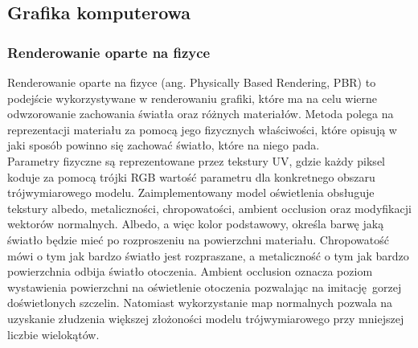 
\subsection{Grafika komputerowa}

\subsubsection{Renderowanie oparte na fizyce}

Renderowanie oparte na fizyce (ang. Physically Based Rendering, PBR) to podejście wykorzystywane w renderowaniu grafiki, które ma na celu wierne odwzorowanie zachowania światła oraz różnych materiałów. Metoda polega na reprezentacji materiału za pomocą jego fizycznych właściwości, które opisują w jaki sposób powinno się zachować światło, które na niego pada.
\\

Parametry fizyczne są reprezentowane przez tekstury UV, gdzie każdy piksel koduje za pomocą trójki RGB wartość parametru dla konkretnego obszaru trójwymiarowego modelu. Zaimplementowany model oświetlenia obsługuje tekstury albedo, metaliczności, chropowatości, ambient occlusion oraz modyfikacji wektorów normalnych.
Albedo, a więc kolor podstawowy, określa barwę jaką światło będzie mieć po rozproszeniu na powierzchni materiału. Chropowatość mówi o tym jak bardzo światło jest rozpraszane, a  metaliczność o tym jak bardzo powierzchnia odbija światło otoczenia. Ambient occlusion oznacza poziom wystawienia powierzchni na oświetlenie otoczenia pozwalając na imitację gorzej doświetlonych szczelin. Natomiast wykorzystanie map normalnych pozwala na uzyskanie złudzenia większej złożoności modelu trójwymiarowego przy mniejszej liczbie wielokątów.
\\

